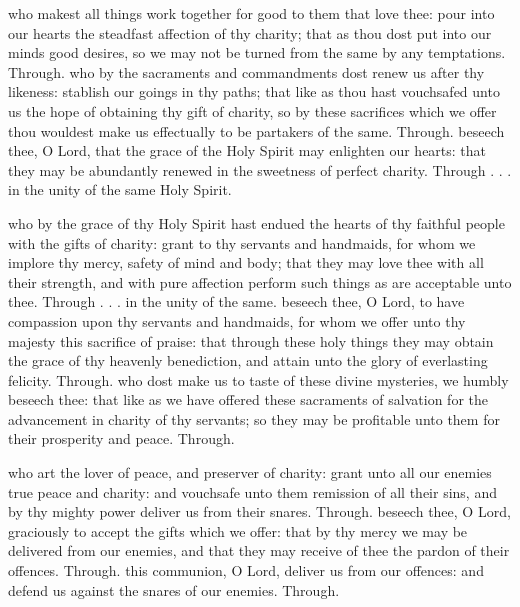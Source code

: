 \begin{multicols}{2}
 who makest all things work together for good to them that love thee: pour into our hearts the steadfast affection of thy charity; that as thou dost put into our minds good desires, so we may not be turned from the same by any temptations. Through.
 who by the sacraments and commandments dost renew us after thy likeness: stablish our goings in thy paths; that like as thou hast vouchsafed unto us the hope of obtaining thy gift of charity, so by these sacrifices which we offer thou wouldest make us effectually to be partakers of the same. Through.
 beseech thee, O Lord, that the grace of the Holy Spirit may enlighten our hearts: that they may be abundantly renewed in the sweetness of perfect charity. Through . . . in the unity of the same Holy Spirit.

 who by the grace of thy Holy Spirit hast endued the hearts of thy faithful people with the gifts of charity: grant to thy servants and handmaids, for whom we implore thy mercy, safety of mind and body; that they may love thee with all their strength, and with pure affection perform such things as are acceptable unto thee. Through . . . in the unity of the same.
 beseech thee, O Lord, to have compassion upon thy servants and handmaids, for whom we offer unto thy majesty this sacrifice of praise: that through these holy things they may obtain the grace of thy heavenly benediction, and attain unto the glory of everlasting felicity. Through.
 who dost make us to taste of these divine mysteries, we humbly beseech thee: that like as we have offered these sacraments of salvation for the advancement in charity of thy servants; so they may be profitable unto them for their prosperity and peace. Through.

 who art the lover of peace, and preserver of charity: grant unto all our enemies true peace and charity: and vouchsafe unto them remission of all their sins, and by thy mighty power deliver us from their snares. Through.
 beseech thee, O Lord, graciously to accept the gifts which we offer: that by thy mercy we may be delivered from our enemies, and that they may receive of thee the pardon of their offences. Through.
 this communion, O Lord, deliver us from our offences: and defend us against the snares of our enemies. Through.


\end{multicols}
